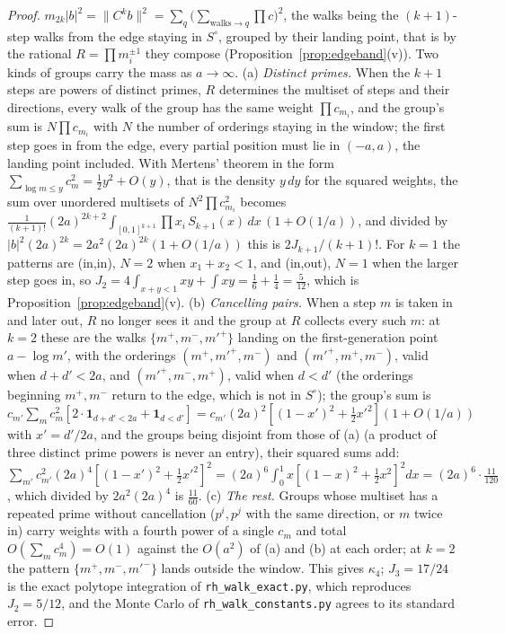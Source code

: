 \documentclass[11pt]{article}
\theoremstyle{definition}
\theoremstyle{remark}
\begin{document}
\begin{proof}
$m_{2k}|b|^2=\|C^kb\|^2=\sum_q\big(\sum_{\text{walks}\to q}\prod c\big)^2$, the walks being the $(k+1)$-step walks from the edge staying in $S^\circ$, grouped by their landing point, that is by the rational $R=\prod m_i^{\pm1}$ they compose (Proposition~\ref{prop:edgeband}(v)). Two kinds of groups carry the mass as $a\to\infty$. (a) \emph{Distinct primes.} When the $k+1$ steps are powers of distinct primes, $R$ determines the multiset of steps and their directions, every walk of the group has the same weight $\prod c_{m_i}$, and the group's sum is $N\prod c_{m_i}$ with $N$ the number of orderings staying in the window; the first step goes in from the edge, every partial position must lie in $(-a,a)$, the landing point included. With Mertens' theorem in the form $\sum_{\log m\le y}c_m^2=\tfrac12y^2+O(y)$, that is the density $y\,dy$ for the squared weights, the sum over unordered multisets of $N^2\prod c_{m_i}^2$ becomes $\frac1{(k+1)!}(2a)^{2k+2}\int_{[0,1]^{k+1}}\prod x_i\,S_{k+1}(x)\,dx\,(1+O(1/a))$, and divided by $|b|^2(2a)^{2k}=2a^2(2a)^{2k}(1+O(1/a))$ this is $2J_{k+1}/(k+1)!$. For $k=1$ the patterns are (in,in), $N=2$ when $x_1+x_2<1$, and (in,out), $N=1$ when the larger step goes in, so $J_2=4\int_{x+y<1}xy+\int xy=\tfrac16+\tfrac14=\tfrac5{12}$, which is Proposition~\ref{prop:edgeband}(v). (b) \emph{Cancelling pairs.} When a step $m$ is taken in and later out, $R$ no longer sees it and the group at $R$ collects every such $m$: at $k=2$ these are the walks $\{m^+,m^-,m'^+\}$ landing on the first-generation point $a-\log m'$, with the orderings $(m^+,m'^+,m^-)$ and $(m'^+,m^+,m^-)$, valid when $d+d'<2a$, and $(m'^+,m^-,m^+)$, valid when $d<d'$ (the orderings beginning $m^+,m^-$ return to the edge, which is not in $S^\circ$); the group's sum is $c_{m'}\sum_mc_m^2[2\cdot\mathbf 1_{d+d'<2a}+\mathbf 1_{d<d'}]=c_{m'}(2a)^2[(1-x')^2+\tfrac12x'^2](1+O(1/a))$ with $x'=d'/2a$, and the groups being disjoint from those of (a) (a product of three distinct prime powers is never an entry), their squared sums add: $\sum_{m'}c_{m'}^2(2a)^4[(1-x')^2+\tfrac12x'^2]^2=(2a)^6\int_0^1x[(1-x)^2+\tfrac12x^2]^2dx=(2a)^6\cdot\tfrac{11}{120}$, which divided by $2a^2(2a)^4$ is $\tfrac{11}{60}$. (c) \emph{The rest.} Groups whose multiset has a repeated prime without cancellation ($p^i,p^j$ with the same direction, or $m$ twice in) carry weights with a fourth power of a single $c_m$ and total $O(\sum_m c_m^4)=O(1)$ against the $O(a^2)$ of (a) and (b) at each order; at $k=2$ the pattern $\{m^+,m^-,m'^-\}$ lands outside the window. This gives $\kappa_4$; $J_3=17/24$ is the exact polytope integration of \texttt{rh\_walk\_exact.py}, which reproduces $J_2=5/12$, and the Monte Carlo of \texttt{rh\_walk\_constants.py} agrees to its standard error.
\end{proof}
\end{document}
